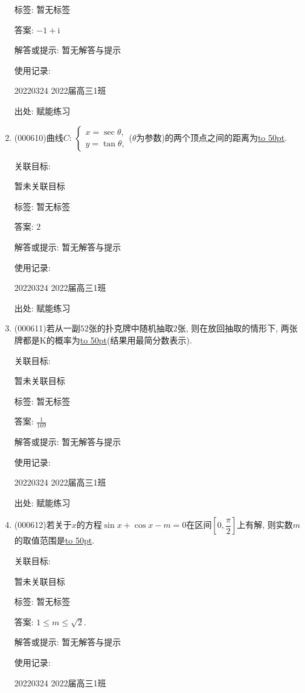 \documentclass[10pt,a4paper]{article}
\newcommand{\blank}[1]{\underline{\hbox to #1pt{}}}
\begin{document}
\begin{enumerate}[1.]
标签: 暂无标签

答案: $-1+\mathrm{i}$

解答或提示: 暂无解答与提示

使用记录:

20220324	2022届高三1班	


出处: 赋能练习
\item { (000610)}曲线$C$: $\begin{cases} x=\sec\theta, \\ y=\tan\theta, \end{cases}$($\theta$为参数)的两个顶点之间的距离为\blank{50}.


关联目标:

暂未关联目标



标签: 暂无标签

答案: $2$

解答或提示: 暂无解答与提示

使用记录:

20220324	2022届高三1班	


出处: 赋能练习
\item { (000611)}若从一副$52$张的扑克牌中随机抽取$2$张, 则在放回抽取的情形下, 两张牌都是K的概率为\blank{50}(结果用最简分数表示).


关联目标:

暂未关联目标



标签: 暂无标签

答案: $\frac 1{169}$

解答或提示: 暂无解答与提示

使用记录:

20220324	2022届高三1班	


出处: 赋能练习
\item { (000612)}若关于$x$的方程$\sin x+\cos x-m=0$在区间$[0,\dfrac{\pi}2]$上有解, 则实数$m$的取值范围是\blank{50}.


关联目标:

暂未关联目标



标签: 暂无标签

答案: $1\le m\le \sqrt 2$.

解答或提示: 暂无解答与提示

使用记录:

20220324	2022届高三1班	



\end{enumerate}
\end{document}
